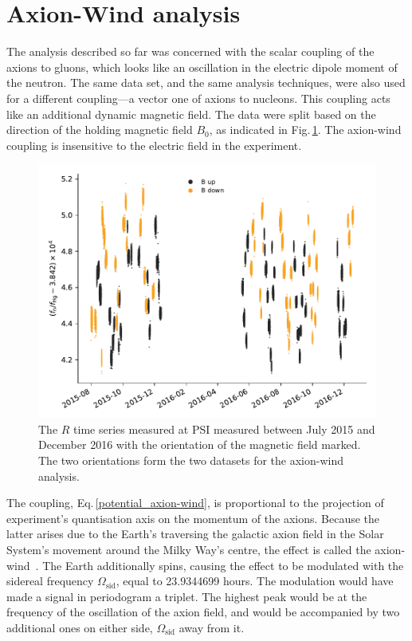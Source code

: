 \section{Axion-Wind analysis}
The analysis described so far was concerned with the scalar coupling of the axions to gluons, which looks like an oscillation in the electric dipole moment of the neutron.
The same data set, and the same analysis techniques, were also used for a different coupling---a vector one of axions to nucleons. This coupling acts like an additional dynamic magnetic field. The data were split based on the direction of the holding magnetic field $B_0$, as indicated in Fig.\,\ref{fig:axions_wind_time_domain}. The axion-wind coupling is insensitive to the electric field in the experiment.

\begin{figure}
  \centering
  \includegraphics[width=\linewidth]{gfx/axions/wind_winddeltah4mm_time_domain_inset_no_yerr.pdf}
  \caption{The $R$ time series measured at PSI measured between July 2015 and December 2016 with the orientation of the magnetic field marked. The two orientations form the two datasets for the axion-wind analysis.}\label{fig:axions_wind_time_domain}
\end{figure}

The coupling, Eq.\,\ref{potential_axion-wind}, is proportional to the projection of experiment's quantisation axis on the momentum of the axions.
Because the latter arises due to the Earth's traversing the galactic axion field in the Solar System's movement around the Milky Way's centre, the effect is called the axion-wind~\cite{Stadnik2014A}.
The Earth additionally spins, causing the effect to be modulated with the sidereal frequency $\Omega_\text{sid}$, equal to \num[detect-all=true]{23.9344699} hours. 
The modulation would have made a signal in periodogram a triplet. The highest peak would be at the frequency of the oscillation of the axion field, and would be accompanied by two additional ones on either side, $\Omega_\text{sid}$ away from it.

